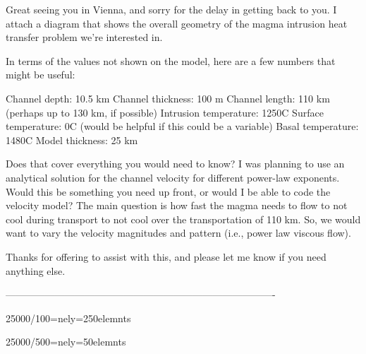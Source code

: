 
Great seeing you in Vienna, and sorry for the delay in getting back to you. I attach a diagram that shows the overall geometry of the magma intrusion heat transfer problem we’re interested in.

In terms of the values not shown on the model, here are a few numbers that might be useful:

    Channel depth: 10.5 km
    Channel thickness: 100 m
    Channel length: 110 km (perhaps up to 130 km, if possible)
    Intrusion temperature: 1250C
    Surface temperature: 0C (would be helpful if this could be a variable)
    Basal temperature: 1480C
    Model thickness: 25 km 

Does that cover everything you would need to know? I was planning to use an analytical solution for the channel velocity for different power-law exponents. Would this be something you need up front, or would I be able to code the velocity model? The main question is how fast the magma needs to flow to not cool during transport to not cool over the transportation of 110 km. So, we would want to vary the velocity magnitudes and pattern (i.e., power law viscous flow).

Thanks for offering to assist with this, and please let me know if you need anything else.

----------------------------------------------------------------------------------

25000/100=nely=250elemnts

25000/500=nely=50elemnts
